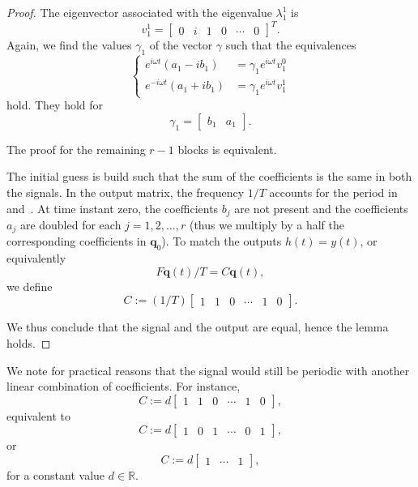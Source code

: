 \begin{proof}
The eigenvector associated with the eigenvalue $\lambda_1^1$ is 
\begin{equation}
  v_1^1=\begin{bmatrix}0&i&1&0&\cdots&0\end{bmatrix}^T. 
\end{equation}
Again, we find the values $\gamma_1$ of the vector $\gamma$ such that the equivalences 
\begin{equation}\begin{cases}    
  e^{i\omega t}(a_1-ib_1)&=\gamma_1 e^{i\omega t}v_1^0\\
  e^{-i\omega t}(a_1+ib_1)&=\gamma_1 e^{i\omega t}v_1^1
\end{cases}\end{equation}
hold. They hold for 
\begin{equation}
  \gamma_1=\begin{bmatrix}b_1&a_1\end{bmatrix}.
\end{equation} 

The proof for the remaining $r-1$ blocks is equivalent.

The initial guess is build such that the sum of the coefficients is the same in both the signals. In the output matrix, the frequency $1/T$ accounts for the period in  and~. At time instant zero, the coefficients $b_j$ are not present and the coefficients $a_j$ are doubled for each $j=1,2,\dots,r$ (thus we multiply by a half the corresponding coefficients in $\mathbf{q}_0$). To match the outputs $h(t)=y(t)$, or equivalently 
\begin{equation}
  F\mathbf{q}(t)/T=C\mathbf{q}(t), 
\end{equation}
we define 
\begin{equation}
  C:=(1/T)\begin{bmatrix}1 & 1 & 0 & \cdots & 1 & 0\end{bmatrix}.
\end{equation}

We thus conclude that the signal and the output are equal, hence the lemma holds.

\end{proof}

We note for practical reasons that the signal would still be periodic with another linear combination of coefficients. For instance, 
\begin{equation}\label{eq:mat_C_generic}
  C:=d\begin{bmatrix}1 & 1 & 0 & \cdots & 1 & 0\end{bmatrix},
\end{equation} 
equivalent to
\begin{equation}
  C:=d\begin{bmatrix}1 & 0 & 1 & \cdots & 0 & 1\end{bmatrix},
\end{equation} 
or 
\begin{equation}
  C:=d\begin{bmatrix}1 & \cdots & 1\end{bmatrix},
\end{equation} 
for a constant value $d\in\mathbb{R}$.

